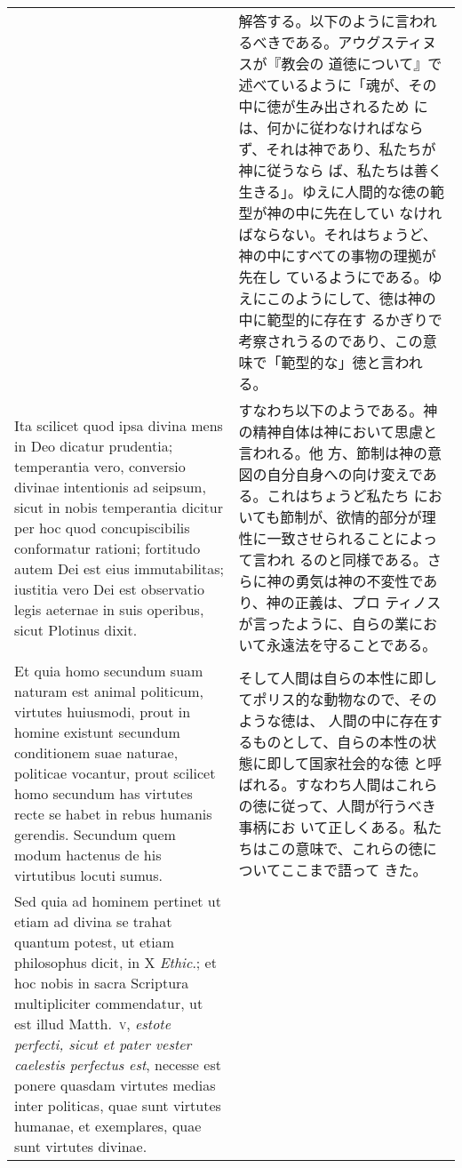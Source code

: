 \documentclass[10pt]{jsarticle}
\begin{document}
\begin{longtable}{p{21em}p{21em}}
&

 解答する。以下のように言われるべきである。アウグスティヌスが『教会の
 道徳について』で述べているように「魂が、その中に徳が生み出されるため
 には、何かに従わなければならず、それは神であり、私たちが神に従うなら
 ば、私たちは善く生きる」。ゆえに人間的な徳の範型が神の中に先在してい
 なければならない。それはちょうど、神の中にすべての事物の理拠が先在し
 ているようにである。ゆえにこのようにして、徳は神の中に範型的に存在す
 るかぎりで考察されうるのであり、この意味で「範型的な」徳と言われる。

 
\\

 Ita scilicet quod ipsa divina mens in Deo dicatur prudentia;
 temperantia vero, conversio divinae intentionis ad seipsum, sicut in
 nobis temperantia dicitur per hoc quod concupiscibilis conformatur
 rationi; fortitudo autem Dei est eius immutabilitas; iustitia vero
 Dei est observatio legis aeternae in suis operibus, sicut Plotinus
 dixit.

&

 すなわち以下のようである。神の精神自体は神において思慮と言われる。他
 方、節制は神の意図の自分自身への向け変えである。これはちょうど私たち
 においても節制が、欲情的部分が理性に一致させられることによって言われ
 るのと同様である。さらに神の勇気は神の不変性であり、神の正義は、プロ
 ティノスが言ったように、自らの業において永遠法を守ることである。

 
\\



 Et quia homo secundum suam naturam est animal politicum, virtutes
 huiusmodi, prout in homine existunt secundum conditionem suae
 naturae, politicae vocantur, prout scilicet homo secundum has
 virtutes recte se habet in rebus humanis gerendis. Secundum quem
 modum hactenus de his virtutibus locuti sumus.

&

 そして人間は自らの本性に即してポリス的な動物なので、そのような徳は、
 人間の中に存在するものとして、自らの本性の状態に即して国家社会的な徳
 と呼ばれる。すなわち人間はこれらの徳に従って、人間が行うべき事柄にお
 いて正しくある。私たちはこの意味で、これらの徳についてここまで語って
 きた。

 
 
\\

 Sed quia ad hominem pertinet ut etiam ad divina se trahat quantum
 potest, ut etiam philosophus dicit, in X {\itshape Ethic}.; et hoc
 nobis in sacra Scriptura multipliciter commendatur, ut est illud
 Matth.~{\scshape v}, {\itshape estote perfecti, sicut et pater vester
 caelestis perfectus est}, necesse est ponere quasdam virtutes medias
 inter politicas, quae sunt virtutes humanae, et exemplares, quae sunt
 virtutes divinae.


\end{longtable}
\end{document}
